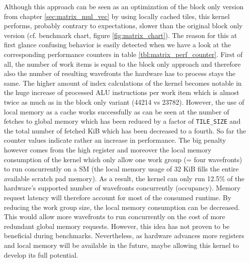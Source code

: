 Although this approach can be seen as an optimization of the block only version from chapter \ref{sec:matrix_mul_vec} by using locally cached tiles, this kernel performs, probably contrary to expectations, slower than the original block only version (cf. benchmark chart, figure \ref{fig:matrix_chart}). The reason for this at first glance confusing behavior is easily detected when we have a look at the corresponding performance counters in table \ref{tbl:matrix_perf_counter}.
First of all, the number of work items is equal to the block only approach and therefore also the number of resulting wavefronts the hardware has to process stays the same. The higher amount of index calculations of the kernel becomes notable in the huge increase of processed ALU instructions per work item which is almost twice as much as in the block only variant (44214 vs 23782). However, the use of local memory as a cache works successfully as can be seen at the number of fetches to global memory which has been reduced by a factor of \lstinline!TILE_SIZE! and the total number of fetched KiB which has been decreased to a fourth. So far the counter values indicate rather an increase in performance. The big penalty however comes from the high register and moreover the local memory consumption of the kernel which only allow one work group (= four wavefronts) to run concurrently on a SM (the local memory usage of 32 KiB fills the entire available scratch pad memory). As a result, the kernel can only run 12.5\% of the hardware's supported number of wavefronts concurrently (occupancy). Memory request latency will therefore account for most of the consumed runtime. By reducing the work group size, the local memory consumption can be decreased. This would allow more wavefronts to run concurrently on the cost of more redundant global memory requests. However, this idea has not proven to be beneficial during benchmarks. Nevertheless, as hardware advances more registers and local memory will be available in the future, maybe allowing this kernel to develop its full potential. 


